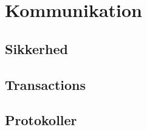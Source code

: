 \chapter{Kommunikation}\label{ch:communication}


\section{Sikkerhed}\label{sec:security}


\section{Transactions}\label{sec:transactions}


\section{Protokoller}\label{sec:protocols}